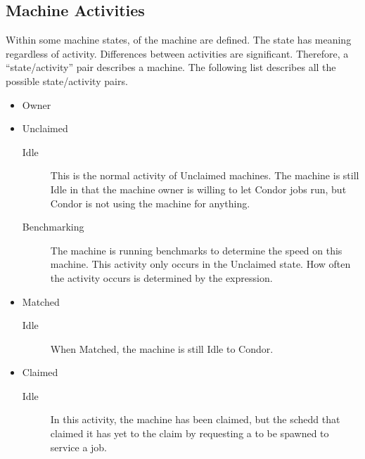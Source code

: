 \subsection{\label{sec:Activities}
Machine Activities}

Within some machine states,
 of the machine are defined.
The state has meaning regardless of activity.
Differences between activities are significant.
Therefore, a ``state/activity'' pair describes
a machine.
The following list describes all the possible state/activity pairs.

\begin{itemize}

\item Owner

\item Unclaimed
\begin{description}
\item[Idle] This is the normal activity of Unclaimed machines.
  The machine is still Idle in that the machine owner is willing to
  let Condor jobs run, but Condor is not using the
  machine for anything.
  
\item[Benchmarking] The machine is running benchmarks to
  determine the speed on this machine.
  This activity only occurs in the Unclaimed state.
  How often the activity occurs is
  determined by the  expression.
\end{description}

\item Matched
\begin{description}
\item[Idle] When Matched, the machine is still Idle to Condor.
\end{description}

\item Claimed
\begin{description}
\item[Idle] In this activity, the machine has been claimed, but the
  schedd that claimed it has yet to  the claim by
  requesting a  to be spawned to service a job.
  

\end{description}
\end{itemize}
